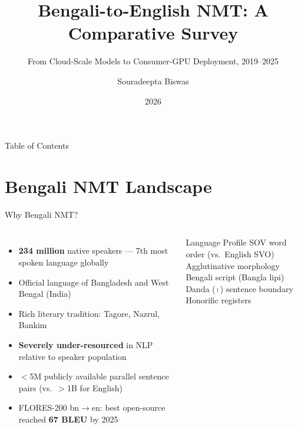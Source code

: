 \documentclass[aspectratio=169,10pt]{beamer}
\title{Bengali-to-English NMT: A Comparative Survey}
\subtitle{From Cloud-Scale Models to Consumer-GPU Deployment, 2019--2025}
\author{Souradeepta Biswas}
\institute{M.S. Computer Science, Syracuse University \\ Independent Researcher}
\date{2026}
\begin{document}
\begin{frame}
  \titlepage
\end{frame}

\begin{frame}{Table of Contents}
  \tableofcontents
\end{frame}

\section{Bengali NMT Landscape}

\begin{frame}{Why Bengali NMT?}
  \begin{columns}
    \begin{itemize}
      \item \textbf{234 million} native speakers --- 7th most spoken language globally
      \item Official language of Bangladesh and West Bengal (India)
      \item Rich literary tradition: Tagore, Nazrul, Bankim
      \item \textbf{Severely under-resourced} in NLP relative to speaker population
      \item $<$5M publicly available parallel sentence pairs (vs.\ $>$1B for English)
      \item FLORES-200 bn$\to$en: best open-source reached \textbf{67 BLEU} by 2025
    \end{itemize}
    \begin{block}{Language Profile}
      SOV word order (vs.\ English SVO)\\
      Agglutinative morphology\\
      Bengali script (Bangla lipi)\\
      Danda (\texttt{।}) sentence boundary\\
      Honorific registers
    \end{block}
  \end{columns}
\end{frame}
\end{document}
